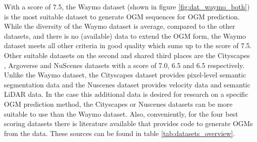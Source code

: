With a score of 7.5, the Waymo \cite{sun2020scalability} dataset (shown in figure \ref{fig:dat_waymo_both}) is the most suitable dataset to generate \gls{OGM} sequences for \gls{OGM} prediction. While the diversity of the Waymo dataset is average, compared to the other datasets, and there is no (available) data to extend the \gls{OGM} form, the Waymo dataset meets all other criteria in good quality which sums up to the score of 7.5. Other suitable datasets on the second and shared third places are the Cityscapes \cite{cordts2016cityscapes}, Argoverse \cite{chang2019argoverse} and NuScenes \cite{caesar2020nuscenes} datasets with a score of 7.0, 6.5 and 6.5 respectively. Unlike the Waymo dataset, the Cityscapes dataset provides pixel-level semantic segmentation data and the Nuscenes dataset provides velocity data and semantic LiDAR data. In the case this additional data is desired for research on a specific \gls{OGM} prediction method, the Cityscapes or Nuscenes datasets can be more suitable to use than the Waymo dataset. Also, conveniently, for the four best scoring datasets there is literature available that provides code to generate \glspl{OGM} from the data. These sources can be found in table \ref{tab:datasets_overview}.  

